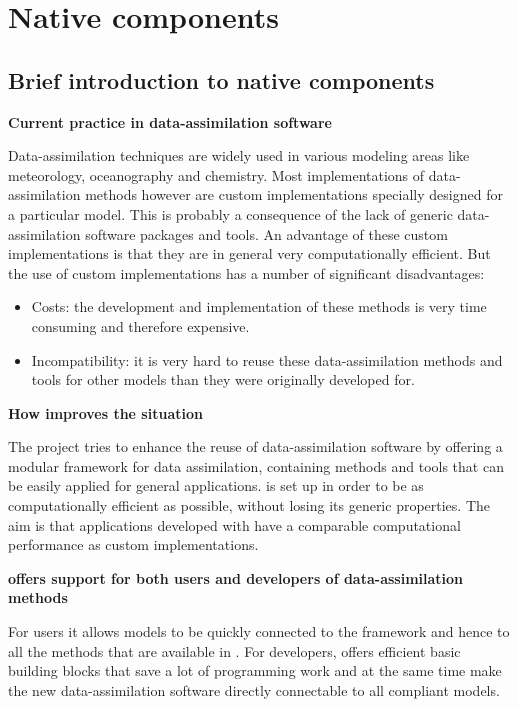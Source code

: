 \section{Native components}

\subsection{Brief introduction to \oda native components}
\textbf{Current practice in data-assimilation software}

Data-assimilation techniques are widely used in various modeling areas like meteorology, oceanography and chemistry. Most implementations of data-assimilation methods however are custom implementations specially designed for a particular model. This is probably a consequence of the lack of generic data-assimilation software packages and tools. An advantage of these custom implementations is that they are in general very computationally efficient. But the use of custom implementations has a number of significant disadvantages:

\begin{itemize}
\item Costs: the development and implementation of these methods is very time consuming and therefore expensive.
\item Incompatibility: it is very hard to reuse these data-assimilation methods and tools for other models than they were originally developed for. 
\end{itemize}
    
\textbf{How \oda improves the situation}

The \oda project tries to enhance the reuse of data-assimilation software by offering a modular framework for data assimilation, containing methods and tools that can be easily applied for general applications. \oda is set up in order to be as computationally efficient as possible, without losing its generic properties. The aim is that applications developed with \oda have a comparable computational performance as custom implementations.

\textbf{\oda offers support for both users and developers of data-assimilation methods}

For users it allows models to be quickly connected to the \oda framework and hence to all the methods that are available in \oda. For developers, \oda offers efficient basic building blocks that save a lot of programming work and at the same time make the new data-assimilation software directly connectable to all \oda compliant models.

